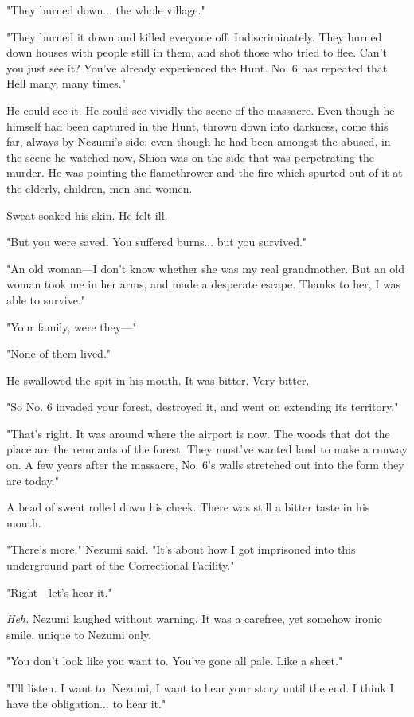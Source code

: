 "They burned down... the whole village."

"They burned it down and killed everyone off. Indiscriminately. They
burned down houses with people still in them, and shot those who tried
to flee. Can't you just see it? You've already experienced the Hunt. No.
6 has repeated that Hell many, many times."

He could see it. He could see vividly the scene of the massacre. Even
though he himself had been captured in the Hunt, thrown down into
darkness, come this far, always by Nezumi's side; even though he had
been amongst the abused, in the scene he watched now, Shion was on the
side that was perpetrating the murder. He was pointing the flamethrower
and the fire which spurted out of it at the elderly, children, men and
women.

Sweat soaked his skin. He felt ill.

"But you were saved. You suffered burns... but you survived."

"An old woman---I don't know whether she was my real grandmother. But an
old woman took me in her arms, and made a desperate escape. Thanks to
her, I was able to survive."

"Your family, were they---"

"None of them lived."

He swallowed the spit in his mouth. It was bitter. Very bitter.

"So No. 6 invaded your forest, destroyed it, and went on extending its
territory."

"That's right. It was around where the airport is now. The woods that
dot the place are the remnants of the forest. They must've wanted land
to make a runway on. A few years after the massacre, No. 6's walls
stretched out into the form they are today."

A bead of sweat rolled down his cheek. There was still a bitter taste in
his mouth.

"There's more," Nezumi said. "It's about how I got imprisoned into this
underground part of the Correctional Facility."

"Right---let's hear it."

\emph{Heh.} Nezumi laughed without warning. It was a carefree, yet somehow
ironic smile, unique to Nezumi only.

"You don't look like you want to. You've gone all pale. Like a sheet."

"I'll listen. I want to. Nezumi, I want to hear your story until the
end. I think I have the obligation... to hear it."

